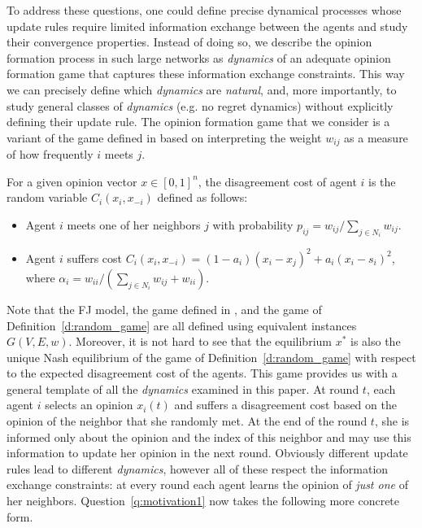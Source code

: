 To address these questions, one could define precise dynamical processes whose
update rules require limited information exchange between the agents and study
their convergence properties. Instead of doing so, we describe the opinion
formation process in such large networks as \emph{dynamics} of an adequate
opinion formation game that captures these information exchange constraints.
This way we can precisely define which \emph{dynamics} are \emph{natural}, and,
more importantly, to study general classes of \emph{dynamics} (e.g. no regret
dynamics) without explicitly defining their update rule.  The opinion formation
game that we consider is a variant of the game defined in \cite{BKO11} based on
interpreting the weight $w_{ij}$ as a measure of how frequently $i$ meets $j$.
%
\begin{definition}\label{d:random_game}
  For a given opinion vector $x \in [0,1]^n$, the disagreement cost of agent
  $i$ is the random variable $C_i(x_i,x_{-i})$ defined as follows:
  \begin{itemize}
    \item Agent $i$ meets one of her neighbors $j$ with probability $p_{ij}=
      w_{ij}/\sum_{j\in N_i}w_{ij}$.
    \item Agent $i$ suffers cost $C_i(x_i , x_{-i}) = (1-a_i)(x_i-x_j)^2 +
      a_i(x_i-s_i)^2$, where $\alpha_i = w_{ii}/(\sum_{j\in
        N_i}w_{ij}+w_{ii})$.
  \end{itemize}
\end{definition}
%
Note that the FJ model, the game defined in \cite{BKO11}, and the game of
Definition~\ref{d:random_game} are all defined using equivalent instances
$G(V,E,w)$.  Moreover, it is not hard to see that the equilibrium $x^*$ is also
the unique Nash equilibrium of the game of Definition~\ref{d:random_game} with
respect to the expected disagreement cost of the agents.  This game provides us
with a general template of all the \emph{dynamics} examined in this paper.  At
round $t$, each agent $i$ selects an opinion $x_i(t)$ and suffers a
disagreement cost based on the opinion of the neighbor that she randomly met.
At the end of the round $t$, she is informed only about the opinion and the
index of this neighbor and may use this information to update her opinion in
the next round.  Obviously different update rules lead to different
\emph{dynamics}, however all of these respect the information exchange
constraints: at every round each agent learns the opinion of \emph{just one} of
her neighbors.  Question~\ref{q:motivation1} now takes the following more
concrete form.

